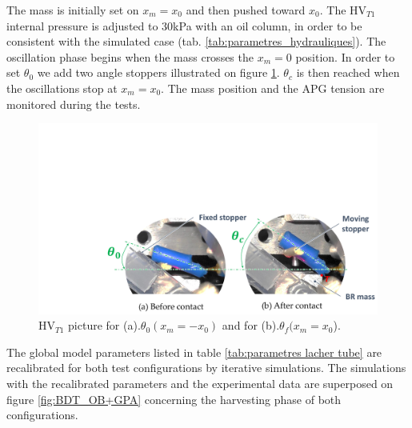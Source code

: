\documentclass[3p,twocolumn,preprint]{elsarticle}
\begin{document}
The mass is initially set on $x_m=x_0$ and then pushed toward $x_0$. The HV$_{T1}$ internal pressure is adjusted to 30kPa with an oil column, in order to be consistent with the simulated case (tab. \ref{tab:parametres_hydrauliques}). The oscillation phase begins when the mass crosses the $x_m=0$ position. In order to set $\theta_0$ we add two angle stoppers illustrated on figure \ref{fig:contact_M_VH_lachers}. $\theta_c$ is then reached when the oscillations stop at $x_m=x_0$. The mass position and the APG tension are monitored during the tests.
\begin{figure}[!htb]
	\begin{center}
		\captionsetup{justification=centering}
		\includegraphics[trim={6.9cm 0cm 0cm 9cm},clip,width=0.9\linewidth]{figures/contact_M_VH_lachers.pdf}
		\caption{HV$_{T1}$ picture for (a).$\theta_0(x_m=-x_{0})$ and for (b).$\theta_f(x_m=x_0$).}
		\label{fig:contact_M_VH_lachers}
	\end{center}
\end{figure}

The global model parameters listed in table \ref{tab:parametres lacher tube} are recalibrated for both test configurations by iterative simulations. The simulations with the recalibrated parameters and the experimental data are superposed on figure \ref{fig:BDT_OB+GPA} concerning the harvesting phase of both configurations. 
\end{document}

